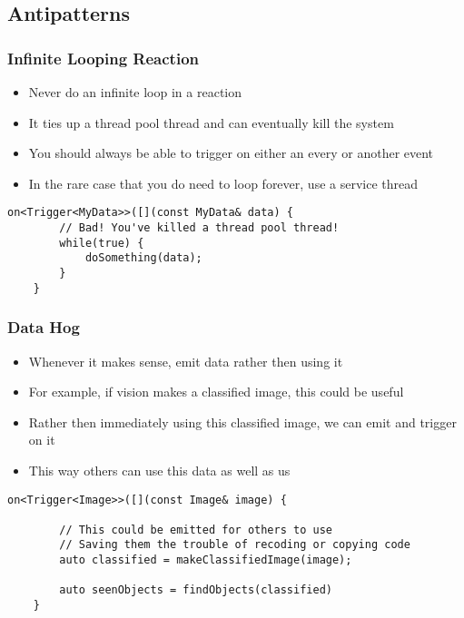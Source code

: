 \documentclass{beamer}
\begin{document}
\subsection{Antipatterns}
\begin{frame}[fragile]
	\frametitle{Infinite Looping Reaction}

	\begin{itemize}
		\item Never do an infinite loop in a reaction
		\item It ties up a thread pool thread and can eventually kill the system
		\item You should always be able to trigger on either an every or another event
		\item In the rare case that you do need to loop forever, use a service thread
	\end{itemize}

	\begin{lstlisting}[language=nuclear]
	on<Trigger<MyData>>([](const MyData& data) {
	    // Bad! You've killed a thread pool thread!
	    while(true) {
	        doSomething(data);
	    }
	}
	\end{lstlisting}
\end{frame}

\begin{frame}[fragile]
	\frametitle{Data Hog}

	\begin{itemize}
		\item Whenever it makes sense, emit data rather then using it
		\item For example, if vision makes a classified image, this could be useful
		\item Rather then immediately using this classified image, we can emit and trigger on it
		\item This way others can use this data as well as us
	\end{itemize}

	\begin{lstlisting}[language=nuclear]
	on<Trigger<Image>>([](const Image& image) {
	
	    // This could be emitted for others to use
	    // Saving them the trouble of recoding or copying code
	    auto classified = makeClassifiedImage(image);
		
	    auto seenObjects = findObjects(classified)
	}
	\end{lstlisting}
\end{frame}
\end{document}

